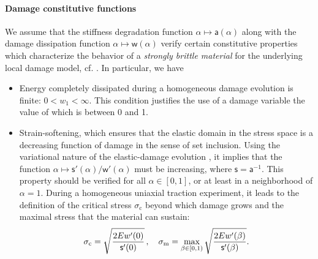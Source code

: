 \paragraph{Damage constitutive functions} We assume that the stiffness degradation function $\alpha\mapsto\mathsf{a}(\alpha)$ along with the damage dissipation function $\alpha\mapsto\mathsf{w}(\alpha)$ verify certain constitutive properties which characterize the behavior of a \emph{strongly brittle material} for the underlying local damage model, cf. \cite{PhamMarigoMaurini:2011,PhamMarigo:2013,SicsicMarigo:2013}. In particular, we have
\begin{itemize}
\item Energy completely dissipated during a homogeneous damage evolution is finite: $0<w_1<\infty$. This condition justifies the use of a damage variable the value of which is between 0 and 1.

\item Strain-softening, which ensures that the elastic domain in the stress space is a decreasing function of damage in the sense of set inclusion. Using the variational nature of the elastic-damage evolution \cite{Marigo:2002}, it implies that the function $\alpha\mapsto \mathsf{s}'(\alpha)/\mathsf{w}'(\alpha)$ must be increasing, where $\mathsf{s}=\mathsf{a}^{-1}$. This property should be verified for all $\alpha\in[0,1]$, or at least in a neighborhood of $\alpha=1$. During a homogeneous uniaxial traction experiment, it leads to the definition of the critical stress $\sigma_\mathrm{c}$ beyond which damage grows and the maximal stress that the material can sustain:
\begin{equation} \label{eq:sigc0}
\sigma_\mathrm{c}=\sqrt{\frac{2Ew'(0)}{\mathsf{s}'(0)}}\,,\quad \sigma_\mathrm{m}=\max_{\beta\in[0,1)}\sqrt{\frac{2Ew'(\beta)}{\mathsf{s}'(\beta)}}.
\end{equation}
\end{itemize}

